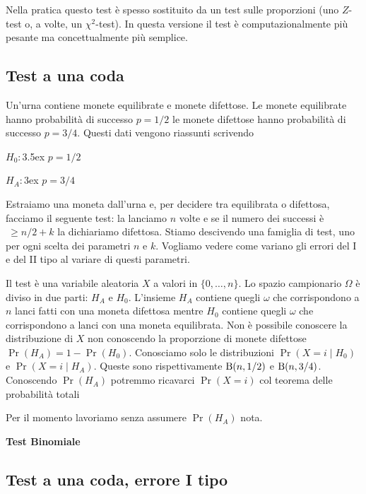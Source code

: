 \documentclass[11pt,openany]{book}
\begin{document}
Nella pratica questo test è spesso sostituito da un test sulle proporzioni (uno $Z$-test o, a volte, un $\chi^2$-test). In questa versione il test è computazionalmente più pesante ma concettualmente più semplice.

\subsection{Test a una coda}\label{Bernoulli_test}

Un'urna contiene monete equilibrate e monete difettose. 
Le monete equilibrate hanno probabilità di successo $p=1/2$ le monete difettose hanno probabilità di successo $p=3/4$. 
Questi dati vengono riassunti scrivendo

$H_0:$\kern3.5ex $p=1/2$

$H_A:$\kern3ex $p=3/4$
 
Estraiamo una moneta dall'urna e, per decidere tra equilibrata o difettosa, facciamo il seguente test: la lanciamo $n$ volte e se il numero dei successi è $\ \ge n/2 + k$ la dichiariamo difettosa.
Stiamo descivendo una famiglia di test, uno per ogni scelta dei parametri $n$ e $k$. 
Vogliamo vedere come variano gli errori del I e del II tipo al variare di questi parametri. 

Il test è una variabile aleatoria $X$ a valori in $\{0,\dots,n\}$.
Lo spazio campionario $\Omega$ è diviso in due parti: $H_A$ e $H_0$.  L'insieme $H_A$ contiene quegli $\omega$ che corrispondono a $n$ lanci fatti con una moneta difettosa mentre $H_0$ contiene quegli $\omega$ che corrispondono a lanci con una moneta equilibrata.
Non è possibile conoscere la distribuzione di $X$ non conoscendo la proporzione di monete difettose $\Pr(H_A)=1-\Pr(H_0)$.
Conosciamo solo le distribuzioni $\Pr(X{=}i\mathbin|H_0)$ e  $\Pr(X{=}i\mathbin|H_A)$.
Queste sono rispettivamente ${\rm B}(n,1/2)$ e  ${\rm B}(n,3/4)$.
Conoscendo $\Pr(H_A)$ potremmo ricavarci $\Pr(X=i)$ col teorema delle probabilità totali


Per il momento lavoriamo senza assumere $\Pr(H_A)$ nota.


\clearpage\hfill\textbf{Test Binomiale}\subsection{Test a una coda, errore I tipo}
\end{document}
